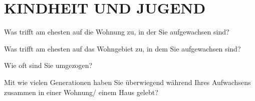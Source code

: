 
\section{\uppercase{Kindheit und Jugend}}
\vspace{.25cm}

\begin{choicequestion}[1]{Was trifft am ehesten auf die Wohnung zu, in der Sie aufgewachsen sind?}
\end{choicequestion}

\separate
\vspace{-.2cm}

\begin{choicequestion}[1]{Was trifft am ehesten auf das Wohngebiet zu, in dem Sie aufgewachsen sind?}
\end{choicequestion}

\separate
\vspace{-.2cm}

\begin{choicequestion}[6]{Wie oft sind Sie umgezogen?}
\end{choicequestion}

\separate
\vspace{-.2cm}

\begin{choicequestion}[1]{Mit wie vielen Generationen haben Sie überwiegend während Ihres Aufwachsens zusammen in einer Wohnung/ einem Haus gelebt?}
\end{choicequestion}


